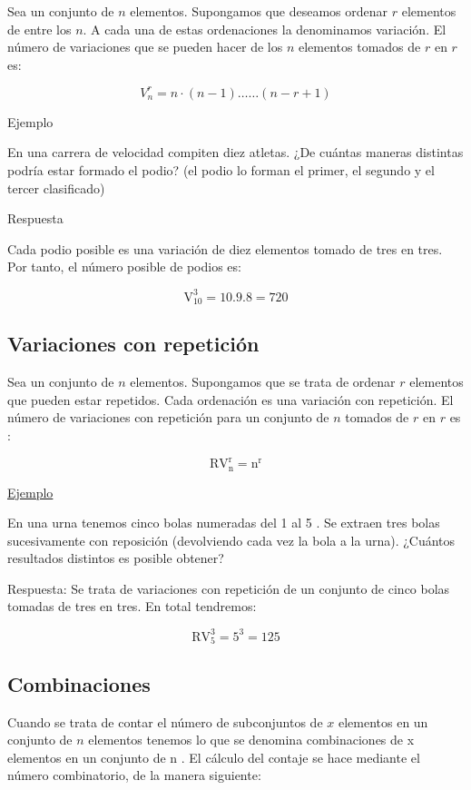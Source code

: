 \documentclass[
  a4paper,
  DIV=11,
  numbers=noendperiod]{scrreprt}
\begin{document}
Sea un conjunto de \(n\) elementos. Supongamos que deseamos ordenar
\(r\) elementos de entre los \(n\). A cada una de estas ordenaciones la
denominamos variación. El número de variaciones que se pueden hacer de
los \(n\) elementos tomados de \(r\) en \(r\) es:

\[
V_{n}^{r}=n \cdot(n-1) \ldots \ldots(n-r+1)
\]

Ejemplo

En una carrera de velocidad compiten diez atletas. ¿De cuántas maneras
distintas podría estar formado el podio? (el podio lo forman el primer,
el segundo y el tercer clasificado)

Respuesta

Cada podio posible es una variación de diez elementos tomado de tres en
tres. Por tanto, el número posible de podios es:

\[
\mathrm{V}_{10}^{3}=10.9 .8=720
\]

\subsection{Variaciones con
repetición}\label{variaciones-con-repeticiuxf3n}

Sea un conjunto de \(n\) elementos. Supongamos que se trata de ordenar
\(r\) elementos que pueden estar repetidos. Cada ordenación es una
variación con repetición. El número de variaciones con repetición para
un conjunto de \(n\) tomados de \(r\) en \(r\) es :

\[
\mathrm{RV}_{\mathrm{n}}^{\mathrm{r}}=\mathrm{n}^{\mathrm{r}}
\]

\ul{Ejemplo}

En una urna tenemos cinco bolas numeradas del 1 al 5 . Se extraen tres
bolas sucesivamente con reposición (devolviendo cada vez la bola a la
urna). ¿Cuántos resultados distintos es posible obtener?

Respuesta: Se trata de variaciones con repetición de un conjunto de
cinco bolas tomadas de tres en tres. En total tendremos:

\[
\mathrm{RV}_{5}^{3}=5^{3}=125
\]

\subsection{Combinaciones}\label{combinaciones}

Cuando se trata de contar el número de subconjuntos de \(x\) elementos
en un conjunto de \(n\) elementos tenemos lo que se denomina
combinaciones de x elementos en un conjunto de n . El cálculo del
contaje se hace mediante el número combinatorio, de la manera siguiente:
\end{document}

